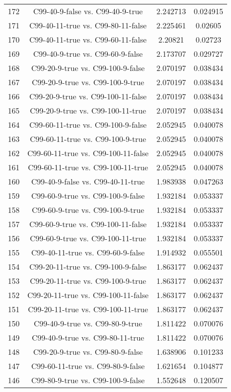 \documentclass[a4paper,10pt]{article}
\begin{document}
\begin{landscape}
\begin{table}[!htp]
\begin{tabular}{cccc}
172&C99-40-9-false vs. C99-40-9-true&2.242713&0.024915\\
171&C99-40-11-true vs. C99-80-11-false&2.225461&0.02605\\
170&C99-40-11-true vs. C99-60-11-false&2.20821&0.02723\\
169&C99-40-9-true vs. C99-60-9-false&2.173707&0.029727\\
168&C99-20-9-true vs. C99-100-9-false&2.070197&0.038434\\
167&C99-20-9-true vs. C99-100-9-true&2.070197&0.038434\\
166&C99-20-9-true vs. C99-100-11-false&2.070197&0.038434\\
165&C99-20-9-true vs. C99-100-11-true&2.070197&0.038434\\
164&C99-60-11-true vs. C99-100-9-false&2.052945&0.040078\\
163&C99-60-11-true vs. C99-100-9-true&2.052945&0.040078\\
162&C99-60-11-true vs. C99-100-11-false&2.052945&0.040078\\
161&C99-60-11-true vs. C99-100-11-true&2.052945&0.040078\\
160&C99-40-9-false vs. C99-40-11-true&1.983938&0.047263\\
159&C99-60-9-true vs. C99-100-9-false&1.932184&0.053337\\
158&C99-60-9-true vs. C99-100-9-true&1.932184&0.053337\\
157&C99-60-9-true vs. C99-100-11-false&1.932184&0.053337\\
156&C99-60-9-true vs. C99-100-11-true&1.932184&0.053337\\
155&C99-40-11-true vs. C99-60-9-false&1.914932&0.055501\\
154&C99-20-11-true vs. C99-100-9-false&1.863177&0.062437\\
153&C99-20-11-true vs. C99-100-9-true&1.863177&0.062437\\
152&C99-20-11-true vs. C99-100-11-false&1.863177&0.062437\\
151&C99-20-11-true vs. C99-100-11-true&1.863177&0.062437\\
150&C99-40-9-true vs. C99-80-9-true&1.811422&0.070076\\
149&C99-40-9-true vs. C99-80-11-true&1.811422&0.070076\\
148&C99-20-9-true vs. C99-80-9-false&1.638906&0.101233\\
147&C99-60-11-true vs. C99-80-9-false&1.621654&0.104877\\
146&C99-80-9-true vs. C99-100-9-false&1.552648&0.120507\\

\end{tabular}
\end{table}
\end{landscape}
\end{document}

